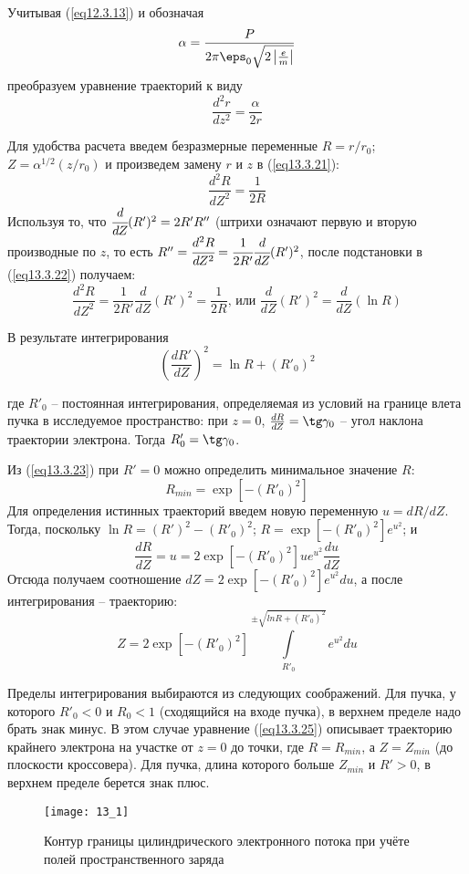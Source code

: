 Учитывая (\ref{eq12.3.13}) и обозначая 
\[
	\alpha = \frac{P}{2\pi\eps_0 \sqrt{2\left|\frac{e}{m}\right|}}
\]
преобразуем уравнение траекторий к виду
\begin{equation}
	\frac{d^2 r}{dz^2} = \frac{\alpha}{2r}
	\label{eq13.3.21}
\end{equation}
 
Для удобства расчета введем безразмерные переменные \( R = r/r_0 \); 
\( Z = \alpha^{1/2}(z/r_0) \) и произведем замену \( r \) и \( z \) в 
(\ref{eq13.3.21}):
\begin{equation}
	\frac{d^2 R}{dZ^2} = \frac{1}{2R}
	\label{eq13.3.22}
\end{equation}
Используя то, что \( \cfrac{d}{dZ}(R')^2 = 2R'R'' \) (штрихи означают первую 
и вторую производные по \( z \), то есть 
\( R'' = \cfrac{d^2 R}{dZ^2} = \cfrac{1}{2R'}\cfrac{d}{dZ}(R')^2 \), после 
подстановки в (\ref{eq13.3.22}) получаем:
\[
	\frac{d^2 R}{dZ^2} = \frac{1}{2R'}\frac{d}{dZ}(R')^2 = \frac{1}{2R}
	\text{, или } \frac{d}{dZ}(R')^2 = \frac{d}{dZ}(\ln R)
\]

В результате интегрирования
\begin{equation}
	\left( \frac{dR'}{dZ} \right)^2 = \ln R + (R'_0)^2
	\label{eq13.3.23}
\end{equation}
 
где \( R'_0 \) -- постоянная интегрирования, определяемая из условий на 
границе влета пучка в исследуемое пространство: при \( z = 0 \), 
\( \frac{dR}{dZ} = \tg\gamma_0 \) -- угол наклона траектории электрона. Тогда 
\( R'_0 = \tg\gamma_0 \).

Из (\ref{eq13.3.23}) при \( R' = 0 \) можно определить минимальное значение 
\( R \):
\begin{equation}
	R_{min} = \exp\left[ -(R'_0)^2 \right]
	\label{eq13.3.24}
\end{equation}
Для определения истинных траекторий введем новую переменную \( u = dR/dZ \).
Тогда, поскольку \( \ln R = (R')^2 - (R'_0)^2 \); 
\( R = \exp\left[ -(R'_0)^2 \right] e^{u^2} \); и 
\[
	\frac{dR}{dZ} = u = 2 \exp\left[ -(R'_0)^2 \right] ue^{u^2} \frac{du}{dZ}
\]
Отсюда получаем соотношение 
\( dZ = 2 \exp\left[ -(R'_0)^2 \right] e^{u^2} du \), а после интегрирования -- 
траекторию:
\begin{equation}
	Z = 2\exp\left[ -(R'_0)^2 \right] 
		\int\limits_{R'_0}^{\pm\sqrt{ln R+(R'_0)^2}} e^{u^2} du
	\label{eq13.3.25}
\end{equation}

Пределы интегрирования выбираются из следующих соображений. Для пучка, у 
которого \( R'_0 < 0 \) и \( R_0 < 1 \)  (сходящийся на входе пучка), в
верхнем пределе надо брать знак минус. В этом случае уравнение 
(\ref{eq13.3.25}) описывает траекторию крайнего электрона на участке от 
\( z = 0 \) до точки, где \( R = R_{min} \), а \( Z = Z_{min} \) (до плоскости 
кроссовера). Для пучка, длина которого больше  \( Z_{min} \) и \( R' > 0 \), в 
верхнем пределе берется знак плюс.
\begin{figure}[h!]
	\center
	\texttt{[image: 13\_1]}
	\caption{Контур границы цилиндрического 
		электронного потока при учёте полей пространственного заряда}
	\label{img13.1}
\end{figure}

